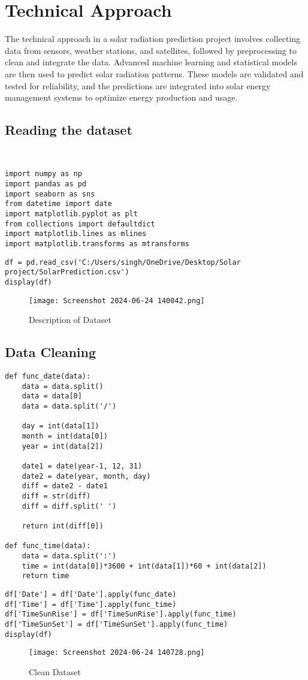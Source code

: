 \documentclass[12pt,a4paper]{report}
\begin{document}
\chapter{Technical Approach}
The technical approach in a solar radiation prediction project involves collecting data from sensors, weather stations, and satellites, followed by preprocessing to clean and integrate the data. Advanced machine learning and statistical models are then used to predict solar radiation patterns. These models are validated and tested for reliability, and the predictions are integrated into solar energy management systems to optimize energy production and usage.
\section{Reading the dataset }\\
\begin{lstlisting}
import numpy as np
import pandas as pd
import seaborn as sns
from datetime import date
import matplotlib.pyplot as plt
from collections import defaultdict
import matplotlib.lines as mlines
import matplotlib.transforms as mtransforms    
\end{lstlisting}
\begin{lstlisting}
df = pd.read_csv('C:/Users/singh/OneDrive/Desktop/Solar project/SolarPrediction.csv')
display(df)
\end{lstlisting}
\begin{figure} [!ht]
    \centering
    \texttt{[image: Screenshot 2024-06-24 140042.png]}
    \caption{Description of Dataset}
    \label{fig:enter-label}
\end{figure}
\section{Data Cleaning}
\begin{lstlisting}
def func_date(data):
    data = data.split()
    data = data[0]
    data = data.split('/') 

    day = int(data[1])
    month = int(data[0])
    year = int(data[2])

    date1 = date(year-1, 12, 31)
    date2 = date(year, month, day)
    diff = date2 - date1
    diff = str(diff)
    diff = diff.split(' ')

    return int(diff[0])

def func_time(data):
    data = data.split(':')
    time = int(data[0])*3600 + int(data[1])*60 + int(data[2])
    return time
\end{lstlisting}
\begin{lstlisting}
df['Date'] = df['Date'].apply(func_date) 
df['Time'] = df['Time'].apply(func_time) 
df['TimeSunRise'] = df['TimeSunRise'].apply(func_time) 
df['TimeSunSet'] = df['TimeSunSet'].apply(func_time) 
display(df)
\end{lstlisting}
\begin{figure} [!ht]
    \centering
    \texttt{[image: Screenshot 2024-06-24 140728.png]}
    \caption{Clean Dataset}
    \label{fig:enter-label}
\end{figure}
\end{document}
